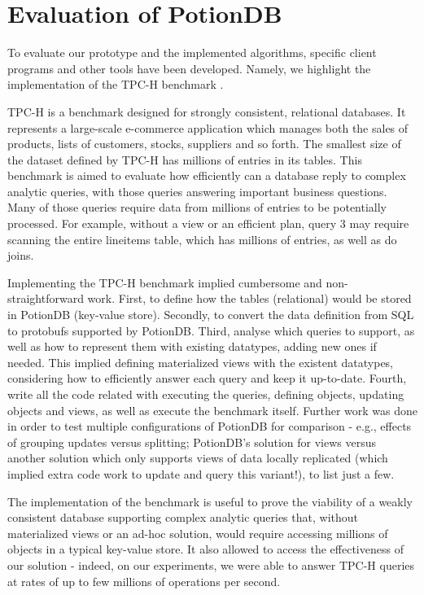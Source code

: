 \section{Evaluation of PotionDB}
\label{sec:potiondb_evaluation}

To evaluate our prototype and the implemented algorithms, specific client programs and other tools have been developed.
Namely, we highlight the implementation of the TPC-H benchmark \cite{???}.

TPC-H is a benchmark designed for strongly consistent, relational databases.
It represents a large-scale e-commerce application which manages both the sales of products, lists of customers, stocks, suppliers and so forth.
The smallest size of the dataset defined by TPC-H has millions of entries in its tables.
This benchmark is aimed to evaluate how efficiently can a database reply to complex analytic queries, with those queries answering important business questions.
Many of those queries require data from millions of entries to be potentially processed.
For example, without a view or an efficient plan, query 3 may require scanning the entire lineitems table, which has millions of entries, as well as do joins. 

Implementing the TPC-H benchmark implied cumbersome and non-straightforward work.
First, to define how the tables (relational) would be stored in PotionDB (key-value store).
Secondly, to convert the data definition from SQL to protobufs supported by PotionDB.
Third, analyse which queries to support, as well as how to represent them with existing datatypes, adding new ones if needed.
This implied defining materialized views with the existent datatypes, considering how to efficiently answer each query and keep it up-to-date.
Fourth, write all the code related with executing the queries, defining objects, updating objects and views, as well as execute the benchmark itself.
Further work was done in order to test multiple configurations of PotionDB for comparison - e.g., effects of grouping updates versus splitting; PotionDB's solution for views versus another solution which only supports views of data locally replicated (which implied extra code work to update  and query this variant!), to list just a few.

The implementation of the benchmark is useful to prove the viability of a weakly consistent database supporting complex analytic queries that, without materialized views or an ad-hoc solution, would require accessing millions of objects in a typical key-value store.
It also allowed to access the effectiveness of our solution - indeed, on our experiments, we were able to answer TPC-H queries at rates of up to few millions of operations per second.

